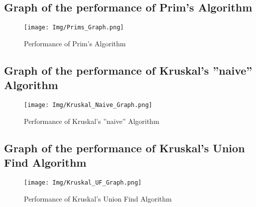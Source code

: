 \pagebreak

\subsection{Graph of the performance of Prim's Algorithm }

	\begin{figure}[H]
		\hspace{-1cm}\texttt{[image: Img/Prims\_Graph.png]}
		\caption{Performance of Prim's Algorithm}
	\end{figure}

\pagebreak
\subsection{Graph of the performance of Kruskal's ''naive'' Algorithm}

	\begin{figure}[H]
		\hspace{-1cm}\texttt{[image: Img/Kruskal\_Naive\_Graph.png]}
		\caption{Performance of Kruskal's ''naive'' Algorithm}
	\end{figure}

\pagebreak

\subsection{Graph of the performance of Kruskal's Union Find Algorithm}

	\begin{figure}[H]
		\hspace{-1cm}\texttt{[image: Img/Kruskal\_UF\_Graph.png]}
		\caption{Performance of Kruskal's Union Find Algorithm}
	\end{figure}

\pagebreak